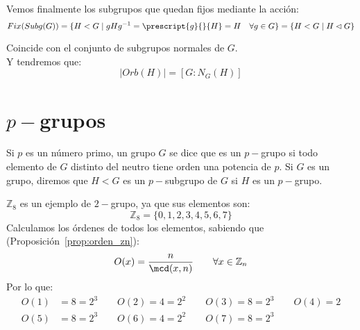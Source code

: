 Vemos finalmente los subgrupos que quedan fijos mediante la acción:
\begin{equation*}
    Fix(Subg(G)) = \{H < G \mid gHg^{-1} = \prescript{g}{}{H} = H \quad \forall g\in G\} = \{H< G \mid H\lhd G\}
\end{equation*}

Coincide con el conjunto de subgrupos normales de $G$.\\

\noindent
Y tendremos que:
\begin{equation*}
    |Orb(H)| = [G:N_G(H)]
\end{equation*}

\section{$p-$grupos}
\begin{definicion}[$p-$grupo]
    Si $p$ es un número primo, un grupo $G$ se dice que es un $p-$grupo si todo elemento de $G$ distinto del neutro tiene orden una potencia de $p$.\newline
    Si $G$ es un grupo, diremos que $H<G$ es un $p-$subgrupo de $G$ si $H$ es un $p-$grupo.
\end{definicion}

\begin{ejemplo}
    $\mathbb{Z}_8$ es un ejemplo de $2-$grupo, ya que sus elementos son:
    \begin{equation*}
        \mathbb{Z}_8 = \{0, 1, 2, 3, 4, 5, 6, 7\}
    \end{equation*}
    Calculamos los órdenes de todos los elementos,  sabiendo que (Proposición~\ref{prop:orden_zn}):
    \begin{equation*}
        O(x) = \dfrac{n}{\mcd(x,n)} \qquad \forall x\in \mathbb{Z}_n
    \end{equation*}
    Por lo que:
    \begin{align*}
        O(1) &= 8 = 2^{3} \qquad 
        O(2) = 4 = 2^2 \qquad 
        O(3) = 8 = 2^3 \qquad 
        O(4) = 2 \\
        O(5) &= 8 = 2^3 \qquad 
        O(6) = 4 = 2^2 \qquad 
        O(7) = 8 = 2^3
    \end{align*}
\end{ejemplo}

